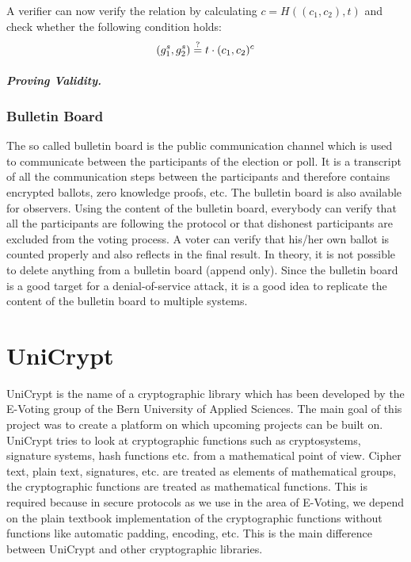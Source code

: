 \documentclass[numbers=noenddot, abstract=on]{scrreprt}
\begin{document}
A verifier can now verify the relation by calculating
$c=H((c_1,c_2),t)$ and check whether the following condition holds:
\begin{equation}
	(g_1^s, g_2^s) \stackrel{?}{=} t \cdot (c_1, c_2)^c \notag
\end{equation}


\subparagraph{Proving Validity.}

\subsubsection{Bulletin Board}
\label{sec:bulletinboard}
The so called bulletin board is the public communication channel which is used
to communicate between the participants of the election or poll. It is a
transcript of all the communication steps between the participants and therefore
contains encrypted ballots, zero knowledge proofs, etc. The bulletin board is
also available for observers. Using the content of the bulletin board, everybody
can verify that all the participants are following the protocol or that
dishonest participants are excluded from the voting process. A voter can verify
that his/her own ballot is counted properly and also reflects in the final
result. In theory, it is not possible to delete anything from a bulletin board
(append only). Since the bulletin board is a good target for a denial-of-service
attack, it is a good idea to replicate the content of the bulletin board to
multiple systems.

\section{UniCrypt}
\label{sec:unicrypt}
UniCrypt is the name of a cryptographic library which has been developed by the
E-Voting group of the Bern University of Applied Sciences. The main goal of this
project was to create a platform on which upcoming projects can be built on.
UniCrypt tries to look at cryptographic functions such as cryptosystems,
signature systems, hash functions etc. from a mathematical point of view. Cipher
text, plain text, signatures, etc. are treated as elements of mathematical
groups, the cryptographic functions are treated as mathematical functions. This
is required because in secure protocols as we use in the area of E-Voting, we
depend on the plain textbook implementation of the cryptographic functions
without functions like automatic padding, encoding, etc. This is the main
difference between UniCrypt and other cryptographic libraries.
\end{document}
